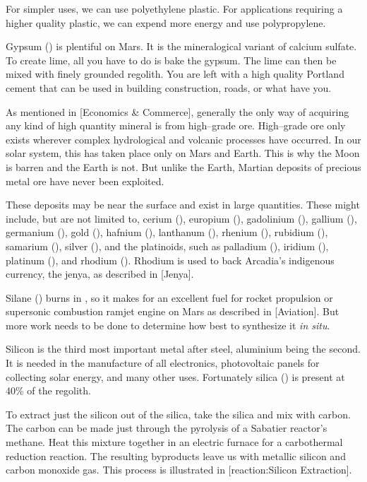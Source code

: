 For simpler uses, we can use polyethylene plastic. For applications requiring a higher quality plastic, we can expend more energy and use polypropylene.

Gypsum () is plentiful on Mars. It is the mineralogical variant of calcium sulfate. To create lime, all you have to do is bake the gypsum. The lime can then be mixed with finely grounded regolith. You are left with a high quality Portland cement that can be used in building construction, roads, or what have you.

As mentioned in [Economics & Commerce], generally the only way of acquiring any kind of high quantity mineral is from high--grade ore. High--grade ore only exists wherever complex hydrological and volcanic processes have occurred. In our solar system, this has taken place only on Mars and Earth. This is why the Moon is barren and the Earth is not. But unlike the Earth, Martian deposits of precious metal ore have never been exploited.

These deposits may be near the surface and exist in large quantities. These might include, but are not limited to, cerium (), europium (), gadolinium (), gallium (), germanium (), gold (), hafnium (), lanthanum (), rhenium (), rubidium (), samarium (), silver (), and the platinoids, such as palladium (), iridium (), platinum (), and rhodium (). Rhodium is used to back Arcadia's indigenous currency, the jenya, as described in [Jenya].

Silane () burns in , so it makes for an excellent fuel for rocket propulsion or supersonic combustion ramjet engine on Mars as described in [Aviation]. But more work needs to be done to determine how best to synthesize it {\it in situ}.

Silicon is the third most important metal after steel, aluminium being the second. It is needed in the manufacture of all electronics, photovoltaic panels for collecting solar energy, and many other uses. Fortunately silica () is present at 40\% of the regolith.

To extract just the silicon out of the silica, take the silica and mix with carbon. The carbon can be made just through the pyrolysis of a Sabatier reactor's methane. Heat this mixture together in an electric furnace for a carbothermal reduction reaction. The resulting byproducts leave us with metallic silicon and carbon monoxide gas. This process is illustrated in [reaction:Silicon Extraction]. 

